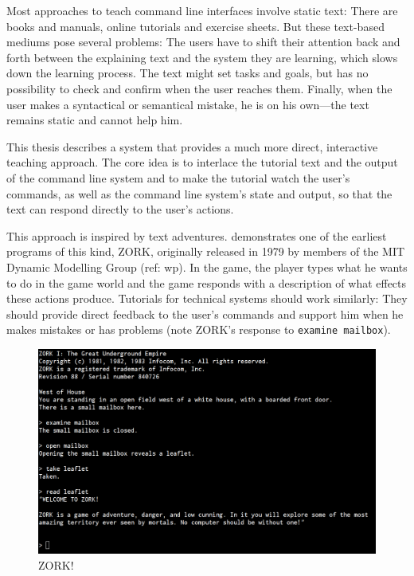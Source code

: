 \documentclass[paper=a4,twoside,abstract=on,cleardoublepage=empty,numbers=noenddot,toc=bib,12pt,appendixprefix=true]{scrreprt}
\begin{document}
Most approaches to teach command line interfaces involve static text: There are books and manuals, online tutorials and exercise sheets. But these text-based mediums pose several problems: The users have to shift their attention back and forth between the explaining text and the system they are learning, which slows down the learning process. The text might set tasks and goals, but has no possibility to check and confirm when the user reaches them. Finally, when the user makes a syntactical or semantical mistake, he is on his own---the text remains static and cannot help him.

This thesis describes a system that provides a much more direct, interactive teaching approach. The core idea is to interlace the tutorial text and the output of the command line system and to make the tutorial watch the user's commands, as well as the command line system's state and output, so that the text can respond directly to the user's actions.

This approach is inspired by text adventures.  demonstrates one of the earliest programs of this kind, \textsc{ZORK}, originally released in 1979 by members of the MIT Dynamic Modelling Group (ref: wp). In the game, the player types what he wants to do in the game world and the game responds with a description of what effects these actions produce. Tutorials for technical systems should work similarly: They should provide direct feedback to the user's commands and support him when he makes mistakes or has problems (note ZORK's response to \texttt{examine mailbox}).

\begin{figure}[tb]
    \includegraphics[width=\textwidth]{zork1.png}
    \centering
    \caption{ZORK!}
    \label{fig:zork}
\end{figure}
\end{document}
